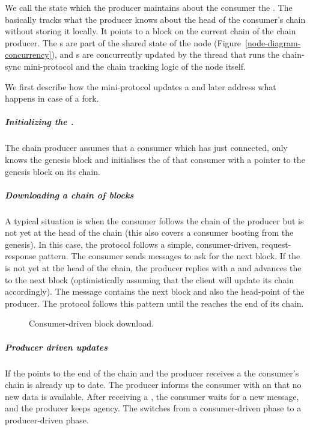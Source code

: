 We call the state which the producer maintains about the consumer the \readpointer{}.
The \readpointer{} basically tracks what the producer knows about the head of
the consumer's chain without storing it locally.
It points to a block on the current chain of the chain producer.
The \readpointer{}s are part of the shared state of the node (Figure~\ref{node-diagram-concurrency}), and
\readpointer{}s are concurrently updated by the thread that runs the chain-sync mini-protocol and the
chain tracking logic of the node itself.

We first describe how the mini-protocol updates a \readpointer{} and later address what happens in case
of a fork.
\subparagraph{Initializing the \readpointer{}.}
The chain producer assumes that a consumer which has just connected,
only knows the genesis block and initialises the \readpointer{} of that consumer
with a pointer to the genesis block on its chain.

\subparagraph{Downloading a chain of blocks}
A typical situation is when the consumer follows the chain of the producer but is not yet at the head of the
chain (this also covers a consumer booting from the genesis).
In this case, the protocol follows a simple, consumer-driven, request-response pattern.
The consumer sends \MsgRequestNext{} messages to ask for the next block.
If the \readpointer{} is not yet at the head of the chain,
the producer replies with a \MsgRollForward{} and advances the \readpointer{} to
the next block (optimistically assuming that the client will update its chain
accordingly).
The \MsgRollForward{} message contains the next block and also the head-point of the producer.
The protocol follows this pattern until the \readpointer{} reaches the end of its chain.

\begin{figure}[ht]
\begin{center}
\end{center}
\caption{Consumer-driven block download.}
\label{read-pointer-consumer-driver}
\end{figure}

\subparagraph{Producer driven updates}
If the \readpointer{} points to the end of the chain and the producer receives
a \MsgRequestNext{}
the consumer's chain is already up to date.
The producer informs the consumer with an \MsgAwaitReply{} that no new data is available.
After receiving a \MsgAwaitReply{}, the consumer waits for a new message, and the producer keeps agency.
The \MsgAwaitReply{} switches from a consumer-driven phase to a producer-driven phase.

